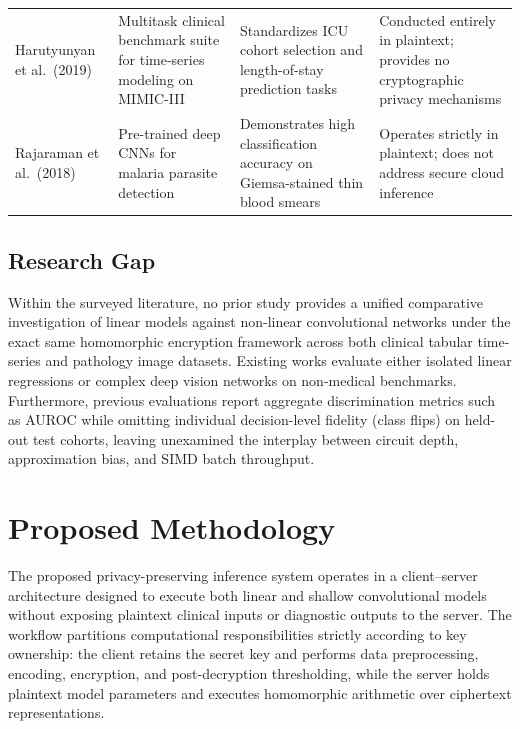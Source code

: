 \documentclass[conference]{IEEEtran}
\begin{document}
\begin{table}[t]
\begin{tabular}{L{3.2cm} L{4.0cm} L{4.0cm} L{4.0cm}}
Harutyunyan et al.\ (2019)~\cite{harutyunyan2019} & Multitask clinical benchmark suite for time-series modeling on MIMIC-III~\cite{mimiciii2016} & Standardizes ICU cohort selection and length-of-stay prediction tasks & Conducted entirely in plaintext; provides no cryptographic privacy mechanisms \\
Rajaraman et al.\ (2018)~\cite{rajaraman2018} & Pre-trained deep CNNs for malaria parasite detection & Demonstrates high classification accuracy on Giemsa-stained thin blood smears & Operates strictly in plaintext; does not address secure cloud inference \\
\bottomrule
\end{tabular}
\end{table}

\subsection{Research Gap}
Within the surveyed literature, no prior study provides a unified comparative investigation of linear models against non-linear convolutional networks under the exact same homomorphic encryption framework across both clinical tabular time-series and pathology image datasets. Existing works evaluate either isolated linear regressions or complex deep vision networks on non-medical benchmarks. Furthermore, previous evaluations report aggregate discrimination metrics such as AUROC while omitting individual decision-level fidelity (class flips) on held-out test cohorts, leaving unexamined the interplay between circuit depth, approximation bias, and SIMD batch throughput.

\section{Proposed Methodology}\label{sec:method}

The proposed privacy-preserving inference system operates in a client--server architecture designed to execute both linear and shallow convolutional models without exposing plaintext clinical inputs or diagnostic outputs to the server. The workflow partitions computational responsibilities strictly according to key ownership: the client retains the secret key and performs data preprocessing, encoding, encryption, and post-decryption thresholding, while the server holds plaintext model parameters and executes homomorphic arithmetic over ciphertext representations.
\end{document}

